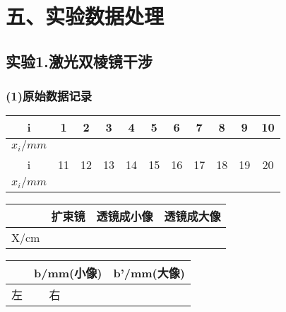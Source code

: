 \documentclass[11pt,a4paper,oneside]{article}
\begin{document}
\section*{五、实验数据处理}
\subsection*{实验1.激光双棱镜干涉}
\subsubsection*{(1)原始数据记录}

\begin{center}
\begin{table}[htbp]
\begin{tabular}{|c|c|c|c|c|c|c|c|c|c|c|}
\hline 
i & 1 & 2 & 3 & 4 & 5 & 6 & 7 & 8 & 9 & 10 
\\ 
\hline 
$x_i/mm$
{%
{%
&%
{%
{%
\\ 
\hline 
i & 11 & 12 & 13 & 14 & 15 & 16 & 17 & 18 & 19 & 20 
\\ 
\hline 
$x_i/mm$ 
{%
{%
&%
{%
{%
\\ 
\hline 
\end{tabular} 
\end{table}
\begin{table}[htbp]
\begin{tabular}{|c|c|c|c|}
\hline 
   & 扩束镜 & 透镜成小像 & 透镜成大像 \\ 
\hline 
X/cm 
{%
&%
{%
\\
\hline 
\end{tabular} 
\end{table}
\begin{table}[htbp]
\begin{tabular}{|c|c|c|c|c|}
\hline  
 & \multicolumn{2}{|c|}{b/mm(小像) }& \multicolumn{2}{|c|}{b'/mm(大像)} \\ 
\hline 
左 & %
\hline 
右 & %
\hline 
\end{tabular}
\end{table}
\end{center}
\end{document}
